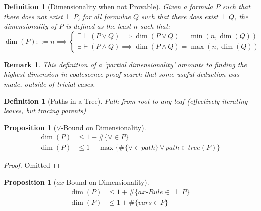 \documentclass{article}
\def\defeq{::=}
\theoremstyle{indented}
\newtheorem{definition}[sec-ctr]{Definition}
\newtheorem{proposition}[sec-ctr]{Proposition}
\newtheorem*{remark*}{Remark}
\begin{document}
        
        \begin{definition}[Dimensionality when not Provable]
            Given a formula $P$ such that there does not exist $\vdash P$, for all formulae $Q$ such that there does exist $\vdash Q$, the dimensionality of $P$ is defined as the least $n$ such that:
            \begin{equation*}
                \dim(P) \defeq n \implies 
                \begin{cases}
                    \exists \vdash (P \vee Q) \implies \dim(P \vee Q) = \min(n, \dim(Q)) \\
                    \exists \vdash (P \wedge Q) \implies \dim(P \wedge Q) = \max(n, \dim(Q))
                \end{cases}
            \end{equation*}
        \end{definition}


        \begin{remark*}
            This definition of a `partial dimensionality' amounts to finding the highest dimension in coalescence proof search that some useful deduction was made, outside of trivial cases.
        \end{remark*}


        \begin{definition}[Paths in a Tree]
            Path from root to any leaf (effectively iterating leaves, but tracing parents)
        \end{definition}


        \begin{proposition}[$\vee$-Bound on Dimensionality]
            \begin{align*}
                \dim(P) &\leq 1 + \#\{\vee \in P\} \\
                \dim(P) &\leq 1 + \max\{\#\{\vee \in path\} \, \forall \, path \in tree(P)\}
            \end{align*}
        \end{proposition}

        \begin{proof}
            Omitted
        \end{proof}


        \begin{proposition}[$ax$-Bound on Dimensionality]
            \begin{align*}
                \dim(P) &\leq 1 + \#\{ax\textit{-Rule} \in \,\, \vdash P\} \\
                \dim(P) &\leq 1 + \#\{vars \in P\}
            \end{align*}
        \end{proposition}
\end{document}
